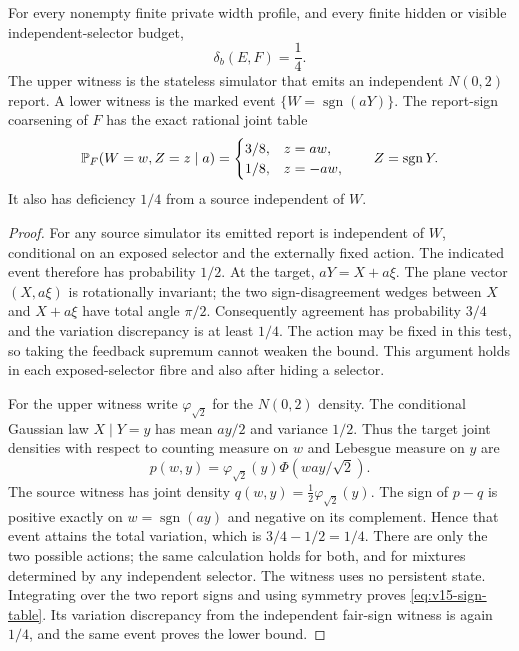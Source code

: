 \begin{theorem}
\label{thm:v15-quarter}
For every nonempty finite private width profile, and every finite hidden
or visible independent-selector budget,
\begin{equation}\label{eq:v15-quarter}
 \delta_b(E,F)=\frac14.
\end{equation}
The upper witness is the stateless simulator that emits an independent
$N(0,2)$ report. A lower witness is the marked event
$\{W=\operatorname{sgn}(aY)\}$. The report-sign coarsening of $F$ has
the exact rational joint table
\begin{equation}\label{eq:v15-sign-table}
 \mathbb P_F(W=w,Z=z\mid a)=
 \begin{cases}3/8,&z=aw,\\1/8,&z=-aw,\end{cases}
 \qquad Z=\operatorname{sgn}Y.
\end{equation}
It also has deficiency $1/4$ from a source independent of $W$.
\end{theorem}
\begin{proof}
For any source simulator its emitted report is independent of $W$,
conditional on an exposed selector and the externally fixed action.
The indicated event therefore has probability $1/2$. At the target,
$aY=X+a\xi$. The plane vector $(X,a\xi)$ is rotationally invariant;
the two sign-disagreement wedges between $X$ and $X+a\xi$ have total
angle $\pi/2$. Consequently agreement has probability $3/4$ and the
variation discrepancy is at least $1/4$. The action may be fixed in
this test, so taking the feedback supremum cannot weaken the bound.
This argument holds in each exposed-selector fibre and also after
hiding a selector.

For the upper witness write $\varphi_{\sqrt2}$ for the $N(0,2)$ density.
The conditional Gaussian law $X\mid Y=y$ has mean $ay/2$ and variance
$1/2$. Thus the target joint densities with respect to counting measure
on $w$ and Lebesgue measure on $y$ are
\[
 p(w,y)=\varphi_{\sqrt2}(y)\Phi(way/\sqrt2).
\]
The source witness has joint density
$q(w,y)=\frac12\varphi_{\sqrt2}(y)$. The sign of $p-q$ is positive
exactly on $w=\operatorname{sgn}(ay)$ and negative on its complement.
Hence that event attains the total variation, which is $3/4-1/2=1/4$.
There are only the two possible actions; the same calculation holds
for both, and for mixtures determined by any independent selector.
The witness uses no persistent state. Integrating over the two report
signs and using symmetry proves \eqref{eq:v15-sign-table}. Its variation
discrepancy from the independent fair-sign witness is again $1/4$,
and the same event proves the lower bound.
\end{proof}

